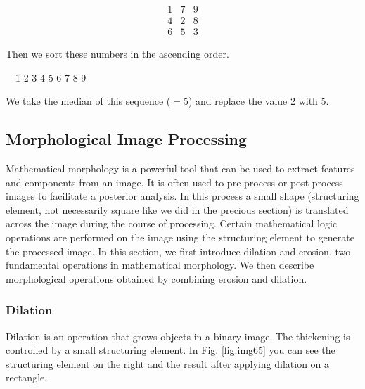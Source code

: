 \[
 \begin{matrix}
  1 & 7 & 9 \\
  4 & 2 & 8 \\
  6 & 5 & 3
 \end{matrix}
\]

Then we sort these numbers in the ascending order. 

\ \ 1 2 3 4 5 6 7 8 9

We take the median of this sequence ($=5$) and replace the value 2 with
5.
\subsection{Morphological Image Processing}
\label{sec:Morpho}
Mathematical morphology is a powerful tool that can be used to extract
features and components from an image. It is often used to pre-process
or post-process images to facilitate a posterior analysis. In this process a
small shape (structuring element, not necessarily square like we did in
the precious section) is translated across the image during the course
of processing. Certain mathematical logic operations are performed on
the image using the structuring element to generate the processed
image.
In this section, we first introduce dilation and erosion, two
fundamental operations in mathematical morphology. We then describe
morphological operations obtained by combining erosion and dilation. 
\subsubsection{Dilation}
Dilation is an operation that grows objects in a binary image. The
thickening is controlled by a small structuring element. In Fig. \ref{fig:img65} 
you can see the structuring element on the right and
the result after applying dilation on a rectangle.

